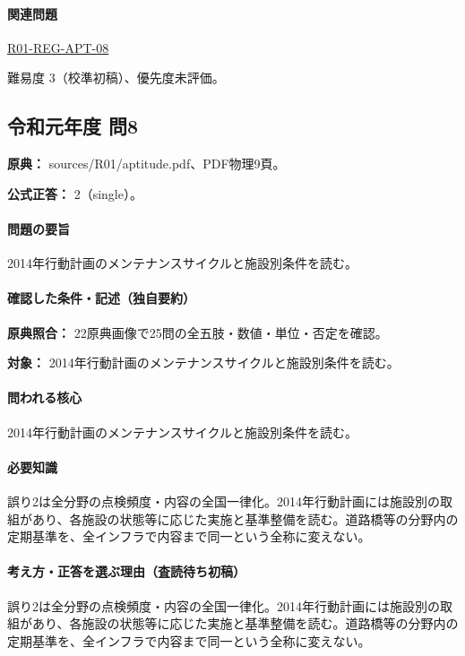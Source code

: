 \paragraph{関連問題} \hyperref[q:r01-reg-apt-08]{R01-REG-APT-08}

\par 難易度 3（校準初稿）、優先度未評価。

\subsection{令和元年度 問8}
\label{q:r01-reg-apt-08}

\noindent\textbf{原典：} sources/R01/aptitude.pdf、PDF物理9頁。

\textbf{公式正答：} 2（single）。

\paragraph{問題の要旨} 2014年行動計画のメンテナンスサイクルと施設別条件を読む。

\paragraph{確認した条件・記述（独自要約）}\mbox{}\par

\noindent\textbf{原典照合：} 22原典画像で25問の全五肢・数値・単位・否定を確認。\par

\noindent\textbf{対象：} 2014年行動計画のメンテナンスサイクルと施設別条件を読む。\par

\paragraph{問われる核心} 2014年行動計画のメンテナンスサイクルと施設別条件を読む。

\paragraph{必要知識} 誤り2は全分野の点検頻度・内容の全国一律化。2014年行動計画には施設別の取組があり、各施設の状態等に応じた実施と基準整備を読む。道路橋等の分野内の定期基準を、全インフラで内容まで同一という全称に変えない。

\paragraph{考え方・正答を選ぶ理由（査読待ち初稿）} 誤り2は全分野の点検頻度・内容の全国一律化。2014年行動計画には施設別の取組があり、各施設の状態等に応じた実施と基準整備を読む。道路橋等の分野内の定期基準を、全インフラで内容まで同一という全称に変えない。

